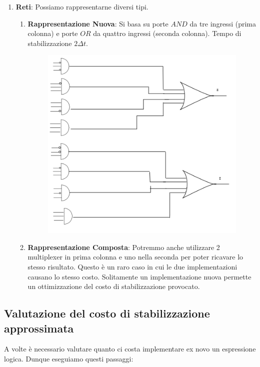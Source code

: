 \documentclass{article}
\begin{document}
\begin{enumerate}
    \item \textbf{Reti}: Possiamo rappresentarne diversi tipi.
    \begin{enumerate}
        \item \textbf{Rappresentazione Nuova}: Si basa su porte $AND$ da tre ingressi (prima colonna) e porte $OR$ da quattro ingressi (seconda colonna). Tempo di stabilizzazione $2\Delta t$.
        \begin{figure}[htbp]
        \center
        \includegraphics[scale=0.475]{img/implementazione1Mltplxr.png}
    \end{figure}
    \item \textbf{Rappresentazione Composta}: Potremmo anche utilizzare 2 multiplexer in prima colonna e uno nella seconda per poter ricavare lo stesso risultato. Questo è un raro caso in cui le due implementazioni causano lo stesso costo. Solitamente un implementazione nuova permette un ottimizzazione del costo di stabilizzazione provocato.
    \end{enumerate}
    
\end{enumerate}

\newpage

\subsection{Valutazione del costo di stabilizzazione approssimata}

A volte è necessario valutare quanto ci costa implementare ex novo un espressione logica. Dunque eseguiamo questi passaggi:
\end{document}
